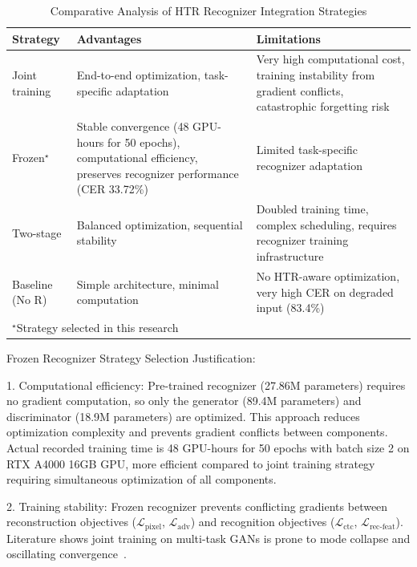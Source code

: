 \documentclass[journal]{IEEEtran}
\begin{document}
\begin{table}[!t]
\renewcommand{\arraystretch}{1.2}
\caption{Comparative Analysis of HTR Recognizer Integration Strategies}
\label{table_ablation_recognizer_strategy}
\centering
\small
\begin{tabular}{|p{2.5cm}|p{2.2cm}|p{2.5cm}|}
\hline
\textbf{Strategy} & \textbf{Advantages} & \textbf{Limitations} \\
\hline
Joint training & End-to-end optimization, task-specific adaptation & Very high computational cost, training instability from gradient conflicts, catastrophic forgetting risk~\cite{kirkpatrick2017overcoming} \\
\hline
Frozen$^\star$ & Stable convergence (48 GPU-hours for 50 epochs), computational efficiency, preserves recognizer performance (CER 33.72\%) & Limited task-specific recognizer adaptation \\
\hline
Two-stage & Balanced optimization, sequential stability & Doubled training time, complex scheduling, requires recognizer training infrastructure \\
\hline
Baseline (No R) & Simple architecture, minimal computation & No HTR-aware optimization, very high CER on degraded input (83.4\%) \\
\hline
\multicolumn{3}{|l|}{\footnotesize $^\star$Strategy selected in this research} \\
\hline
\end{tabular}
\end{table}

Frozen Recognizer Strategy Selection Justification:

1. Computational efficiency: Pre-trained recognizer (27.86M parameters) requires no gradient computation, so only the generator (89.4M parameters) and discriminator (18.9M parameters) are optimized. This approach reduces optimization complexity and prevents gradient conflicts between components. Actual recorded training time is 48 GPU-hours for 50 epochs with batch size 2 on RTX A4000 16GB GPU, more efficient compared to joint training strategy requiring simultaneous optimization of all components.

2. Training stability: Frozen recognizer prevents conflicting gradients between reconstruction objectives ($\mathcal{L}_{\text{pixel}}$, $\mathcal{L}_{\text{adv}}$) and recognition objectives ($\mathcal{L}_{\text{ctc}}$, $\mathcal{L}_{\text{rec-feat}}$). Literature shows joint training on multi-task GANs is prone to mode collapse and oscillating convergence~\cite{souibgui2022,kang2021pay}.
\end{document}

